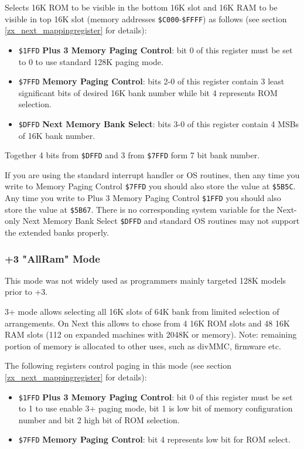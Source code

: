 \documentclass[twoside,openright,a4paper]{book}
\begin{document}
Selects 16K ROM to be visible in the bottom 16K slot and 16K RAM to be visible in top 16K slot (memory addresses {\tt \$C000}-{\tt \$FFFF}) as follows (see section \ref{zx_next_mappingregister} for details):

\begin{itemize}
	\item {\tt \$1FFD} \textbf{Plus 3 Memory Paging Control}: bit 0 of this register must be set to 0 to use standard 128K paging mode.
	
	\item {\tt \$7FFD} \textbf{Memory Paging Control}: bits 2-0 of this register contain 3 least significant bits of desired 16K bank number while bit 4 represents ROM selection.
	
	\item {\tt \$DFFD} \textbf{Next Memory Bank Select}: bits 3-0 of this register contain 4 MSBs of 16K bank number.
\end{itemize}

Together 4 bits from {\tt \$DFFD} and 3 from {\tt \$7FFD} form 7 bit bank number.

If you are using the standard interrupt handler or OS routines, then any time you write to Memory Paging Control {\tt \$7FFD} you should also store the value at {\tt \$5B5C}. Any time you write to Plus 3 Memory Paging Control {\tt \$1FFD} you should also store the value at {\tt \$5B67}. There is no corresponding system variable for the Next-only Next Memory Bank Select {\tt \$DFFD} and standard OS routines may not support the extended banks properly.


\subsubsection{+3 "AllRam" Mode}

This mode was not widely used as programmers mainly targeted 128K models prior to +3.

3+ mode allows selecting all 16K slots of 64K bank from limited selection of arrangements. On Next this allows to chose from 4 16K ROM slots and 48 16K RAM slots (112 on expanded machines with 2048K or memory). Note: remaining portion of memory is allocated to other uses, such as divMMC, firmware etc.

The following registers control paging in this mode (see section \ref{zx_next_mappingregister} for details):

\begin{itemize}
	\item {\tt \$1FFD} \textbf{Plus 3 Memory Paging Control}: bit 0 of this register must be set to 1 to use enable 3+ paging mode, bit 1 is low bit of memory configuration number and bit 2 high bit of ROM selection.
	
	\item {\tt \$7FFD} \textbf{Memory Paging Control}: bit 4 represents low bit for ROM select.
\end{itemize}
\end{document}
